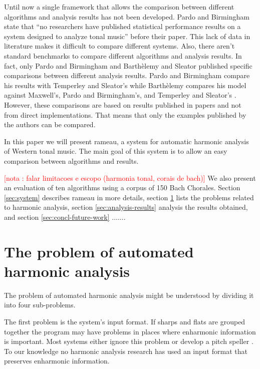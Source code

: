\documentclass{article}
\newcounter{notacounter}
\newcommand{\nota}[1]{
  \addtocounter{notacounter}{1}
  \textcolor{red}{[nota \arabic{notacounter}: #1]}
}
\begin{document}
Until now a single framework that allows the comparison between
different algorithms and analysis results has not been developed.
Pardo and Birmingham state that ``no researchers have published
statistical performance results on a system designed to analyze tonal
music'' \cite{pardo02:algorithms} before their paper. This lack of
data in literature makes it difficult to compare different systems.
Also, there aren't standard benchmarks to compare different algorithms
and analysis results. In fact, only Pardo and Birmingham
\cite{pardo00:automated} and Barthèlemy and Sleator
\cite{barthelemy01:figured} published specific comparisons between
different analysis results. Pardo and Birmingham compare his results
with Temperley and Sleator's \cite{temperley99:modeling} while
Barthèlemy compares his model against Maxwell's, Pardo and
Birmingham's, and Temperley and Sleator's
\cite{maxwell92:expert,temperley96:algorithm,pardo99:automated}.
However, these comparisons are based on results published in papers
and not from direct implementations. That means that only the examples
published by the authors can be compared.

In this paper we will present rameau, a system for automatic harmonic
analysis of Western tonal music. The main goal of this system is to
allow an easy comparison between algorithms and results. \nota{falar
  limitacoes e escopo (harmonia tonal, corais de bach)} We also
present an evaluation of ten algorithms using a corpus of 150 Bach
Chorales. Section \ref{sec:system} describes rameau in more details,
section \ref{sec:problem} lists the problems related to harmonic
analysis, section \ref{sec:analysis-results} analysis the results
obtained, and section \ref{sec:concl-future-work} .......

\section{The problem of automated harmonic analysis}
\label{sec:problem}

The problem of automated harmonic analysis might be understood by
dividing it into four sub-problems. 

The first problem is the system's input format. If sharps and flats
are grouped together the program may have problems in places where
enharmonic information is important. Most systems either ignore this
problem or develop a pitch speller \cite{temperley99:modeling}. To our
knowledge no harmonic analysis research has used an input format that
preserves enharmonic information.
\end{document}
